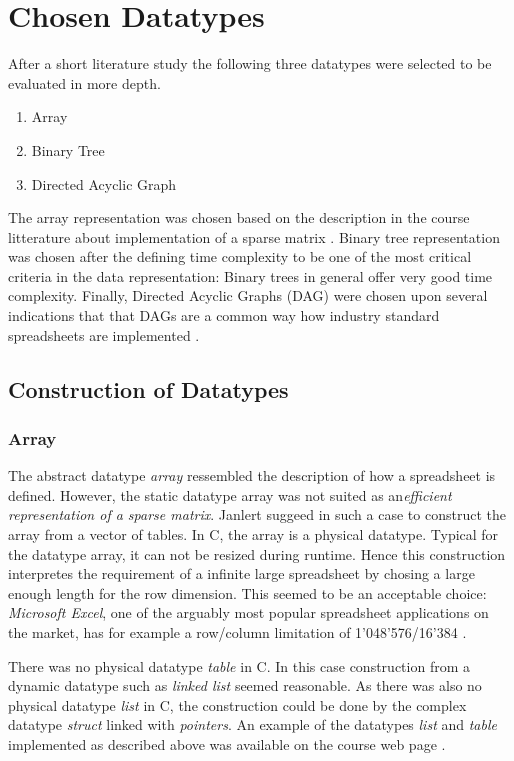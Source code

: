 \documentclass[a4paper,11pt,twoside]{article}
\begin{document}
\section{Chosen Datatypes}
After a short literature study the following three datatypes were
selected to be evaluated in more depth.

\begin{enumerate}
\item Array
\item Binary Tree
\item Directed Acyclic Graph
\end{enumerate}

The array representation was chosen based on the description in the 
course litterature about implementation of a sparse matrix
\cite{janlert2000}. Binary tree representation was chosen after the
defining time complexity to be one of the most critical criteria in
the data representation: Binary trees in general offer very good time
complexity. Finally, Directed Acyclic Graphs (DAG) were chosen upon
several indications that that DAGs are a common way how industry
standard spreadsheets are implemented \cite{spreadsheet1}\cite{spreadsheet2}
\cite{spreadsheet3}.


\subsection{Construction of Datatypes}
\subsubsection{Array}
The abstract datatype \emph{array} ressembled the description of 
how a spreadsheet is defined. However, the static datatype array was
not suited as an\emph{efficient representation of a  sparse
 matrix}. Janlert \cite[pp 101-103]{janlert2000} suggeed in such a
case to construct the array from a vector of tables. In C, the 
array is a physical datatype. Typical for the datatype array, it can
not be resized during runtime. Hence this construction interpretes the
requirement of a infinite large spreadsheet by chosing a large enough
length for the row dimension. This seemed to be an acceptable choice:
\textit{Microsoft Excel}, one of the arguably most popular spreadsheet
applications on the market, has for example a row/column limitation of
1'048'576/16'384 \cite{excel_limit}.

There was no physical datatype \textit{table} in C. In this case construction
from a dynamic datatype such as \textit{linked list} seemed reasonable. As
there was also no physical datatype \textit{list} in C, the construction could
be done by the complex datatype \textit{struct} linked with
\textit{pointers}. An example of the datatypes \textit{list} and
\textit{table} implemented as described above was available on the course
web page \cite{datatypes}.
\end{document}
